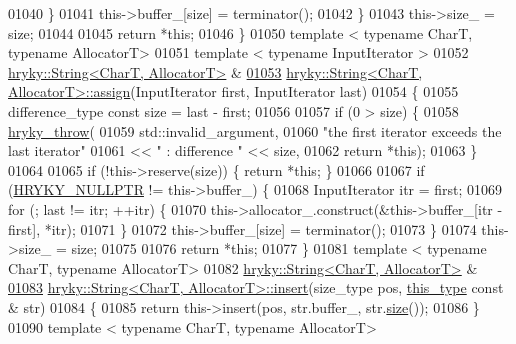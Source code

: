 \begin{DoxyCode}
01040         \}
01041         this->buffer\_[size] = terminator();
01042     \}
01043     this->size\_ = size;
01044 
01045     \textcolor{keywordflow}{return} *\textcolor{keyword}{this};
01046 \}
01050 \textcolor{keyword}{template} < \textcolor{keyword}{typename} CharT, \textcolor{keyword}{typename} AllocatorT>
01051 \textcolor{keyword}{template} < \textcolor{keyword}{typename} InputIterator >
01052 \hyperlink{classhryky_1_1_string}{hryky::String<CharT, AllocatorT>} &
\hypertarget{string_8h_source_l01053}{}\hyperlink{classhryky_1_1_string_aa9cd66f59bbf315959cdcf1e4dd627a2}{01053} \hyperlink{classhryky_1_1_string}{hryky::String<CharT, AllocatorT>::assign}(InputIterator first, InputIterator 
      last)
01054 \{
01055     difference\_type \textcolor{keyword}{const} size = last - first;
01056 
01057     \textcolor{keywordflow}{if} (0 > size) \{
01058         \hyperlink{debug__common_8h_af50606eac4009921527ddcaed392b2c2}{hryky_throw}(
01059             std::invalid\_argument,
01060             \textcolor{stringliteral}{"the first iterator exceeds the last iterator"}
01061             << \textcolor{stringliteral}{" : difference "} << size,
01062             \textcolor{keywordflow}{return} *\textcolor{keyword}{this});
01063     \}
01064 
01065     \textcolor{keywordflow}{if} (!this->reserve(size)) \{ \textcolor{keywordflow}{return} *\textcolor{keyword}{this}; \}
01066 
01067     \textcolor{keywordflow}{if} (\hyperlink{common_8h_a4cd4ac09cfcdbd6b30ee69afc156e210}{HRYKY_NULLPTR} != this->buffer\_) \{
01068         InputIterator itr = first;
01069         \textcolor{keywordflow}{for} (; last != itr; ++itr) \{
01070             this->allocator\_.construct(&this->buffer\_[itr - first], *itr);
01071         \}
01072         this->buffer\_[size] = terminator();
01073     \}
01074     this->size\_ = size;
01075 
01076     \textcolor{keywordflow}{return} *\textcolor{keyword}{this};
01077 \}
01081 \textcolor{keyword}{template} < \textcolor{keyword}{typename} CharT, \textcolor{keyword}{typename} AllocatorT>
01082 \hyperlink{classhryky_1_1_string}{hryky::String<CharT, AllocatorT>} &
\hypertarget{string_8h_source_l01083}{}\hyperlink{classhryky_1_1_string_a9895ebf2c4792fc2636caf5c6a9b31c3}{01083} \hyperlink{classhryky_1_1_string}{hryky::String<CharT, AllocatorT>::insert}(size\_type pos, \hyperlink{classhryky_1_1_string}{this_type} \textcolor{keyword}{const} & str)
01084 \{
01085     \textcolor{keywordflow}{return} this->insert(pos, str.buffer\_, str.\hyperlink{classhryky_1_1_string_a9db0f71dce7b2de86a54ab5323759265}{size}());
01086 \}
01090 \textcolor{keyword}{template} < \textcolor{keyword}{typename} CharT, \textcolor{keyword}{typename} AllocatorT>

\end{DoxyCode}
